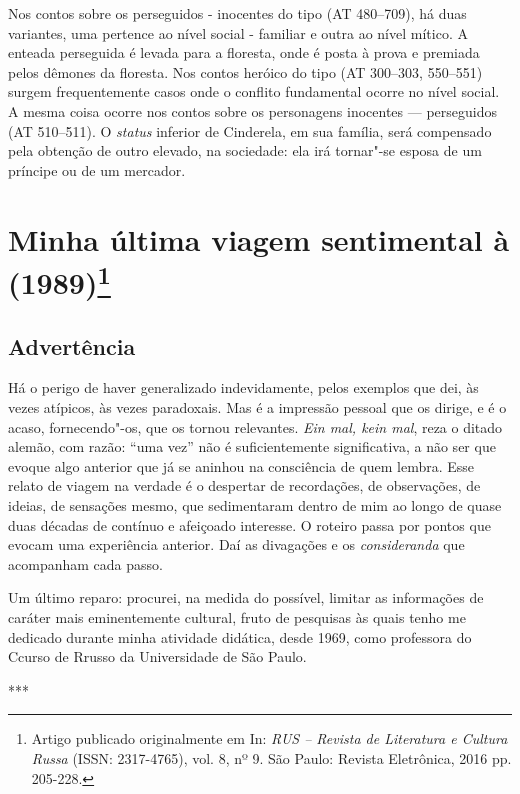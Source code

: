 Nos contos sobre os perseguidos - inocentes do tipo (AT 480--709), há
duas variantes, uma pertence ao nível social - familiar e outra ao nível
mítico. A enteada perseguida é levada para a floresta, onde é posta à
prova e premiada pelos dêmones da floresta. Nos contos heróico do tipo
(AT 300--303, 550--551) surgem frequentemente casos onde o conflito
fundamental ocorre no nível social. A mesma coisa ocorre nos contos
sobre os personagens inocentes --- perseguidos (AT 510--511).
O \emph{status} inferior de Cinderela, em sua família, será compensado
pela obtenção de outro elevado, na sociedade: ela irá tornar"-se esposa
de um príncipe ou de um mercador.

\chapter{Minha última viagem sentimental à  (1989)\footnote{Artigo
  publicado originalmente em In: \emph{RUS -- Revista de Literatura e
  Cultura Russa} (ISSN: 2317-4765), vol. 8, nº 9. São Paulo: Revista
  Eletrônica, 2016 pp. 205-228.}}

\section{Advertência}

Há o perigo de haver generalizado indevidamente, pelos exemplos que dei,
às vezes atípicos, às vezes paradoxais. Mas é a impressão pessoal que os
dirige, e é o acaso, fornecendo"-os, que os tornou relevantes. \emph{Ein
mal, kein mal}, reza o ditado alemão, com razão: ``uma vez''
não é suficientemente significativa, a não ser que evoque
algo anterior que já se aninhou na consciência de quem lembra. Esse
relato de viagem na verdade é o despertar de recordações, de
observações, de ideias, de sensações mesmo, que sedimentaram dentro de
mim ao longo de quase duas décadas de contínuo e afeiçoado interesse. O
roteiro passa por pontos que evocam uma experiência anterior. Daí as
divagações e os \emph{consideranda} que acompanham cada passo.

Um último reparo: procurei, na medida do possível, limitar as
informações de caráter mais eminentemente cultural, fruto de pesquisas
às quais tenho me dedicado durante minha atividade didática, desde 1969, como
professora do Ccurso de Rrusso da Universidade de São Paulo.

\begin{center}
***
\end{center}


